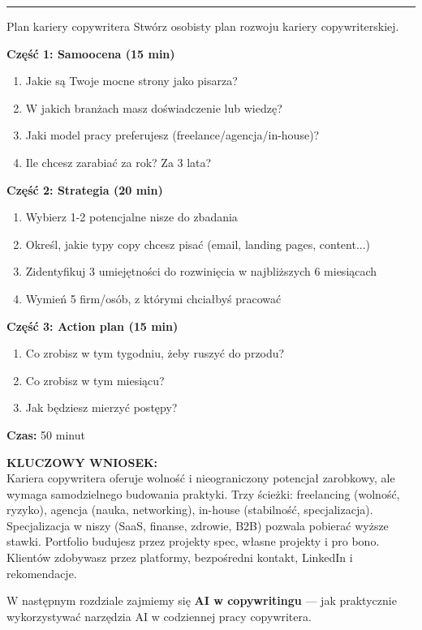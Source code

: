 \documentclass[
  12pt,
  a4paper,
  twoside,
  openright,
  12pt,
  DIV=12,
  BCOR=12mm]{scrbook}
\newcommand{\decoline}{%
  \begin{center}
    \textcolor{bordergray}{\rule{0.3\textwidth}{0.5pt}}
  \end{center}
}
\newcommand{\takeaway}[1]{%
  \begin{tcolorbox}[
    enhanced,
    colback=accentgreen!10,
    colframe=accentgreen,
    boxrule=0pt,
    borderline south={3pt}{0pt}{accentgreen},
    sharp corners,
    left=15pt, right=15pt, top=10pt, bottom=10pt
  ]
    \textbf{\color{accentgreen}KLUCZOWY WNIOSEK:}\\[5pt]
    #1
  \end{tcolorbox}
}
\begin{document}
\decoline

\begin{cwiczenie}{Plan kariery copywritera}
Stwórz osobisty plan rozwoju kariery copywriterskiej.

\textbf{Część 1: Samoocena (15 min)}
\begin{enumerate}
  \item Jakie są Twoje mocne strony jako pisarza?
  \item W jakich branżach masz doświadczenie lub wiedzę?
  \item Jaki model pracy preferujesz (freelance/agencja/in-house)?
  \item Ile chcesz zarabiać za rok? Za 3 lata?
\end{enumerate}

\textbf{Część 2: Strategia (20 min)}
\begin{enumerate}
  \item Wybierz 1-2 potencjalne nisze do zbadania
  \item Określ, jakie typy copy chcesz pisać (email, landing pages, content...)
  \item Zidentyfikuj 3 umiejętności do rozwinięcia w najbliższych 6 miesiącach
  \item Wymień 5 firm/osób, z którymi chciałbyś pracować
\end{enumerate}

\textbf{Część 3: Action plan (15 min)}
\begin{enumerate}
  \item Co zrobisz w tym tygodniu, żeby ruszyć do przodu?
  \item Co zrobisz w tym miesiącu?
  \item Jak będziesz mierzyć postępy?
\end{enumerate}

\textbf{Czas:} 50 minut
\end{cwiczenie}

\takeaway{Kariera copywritera oferuje wolność i nieograniczony potencjał zarobkowy, ale wymaga samodzielnego budowania praktyki. Trzy ścieżki: freelancing (wolność, ryzyko), agencja (nauka, networking), in-house (stabilność, specjalizacja). Specjalizacja w niszy (SaaS, finanse, zdrowie, B2B) pozwala pobierać wyższe stawki. Portfolio budujesz przez projekty spec, własne projekty i pro bono. Klientów zdobywasz przez platformy, bezpośredni kontakt, LinkedIn i rekomendacje.}

W następnym rozdziale zajmiemy się \textbf{AI w copywritingu} --- jak
praktycznie wykorzystywać narzędzia AI w codziennej pracy copywritera.
\end{document}
